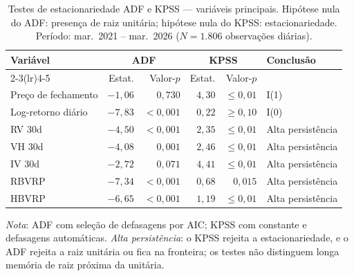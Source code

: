 \begin{table}[H]
\centering
\small
\caption[Testes de estacionariedade ADF e KPSS]{Testes de estacionariedade ADF e KPSS --- variáveis principais. Hipótese nula do ADF: presença de raiz unitária; hipótese nula do KPSS: estacionariedade. Período: mar.\ 2021 -- mar.\ 2026 ($N = 1{.}806$ observações diárias).}
\label{tab:dados-adf-kpss}
\begin{tabular}{lrrrrl}
\toprule
Variável & \multicolumn{2}{c}{ADF} & \multicolumn{2}{c}{KPSS} & Conclusão \\
\cmidrule(lr){2-3}\cmidrule(lr){4-5}
 & Estat. & Valor-$p$ & Estat. & Valor-$p$ & \\
\midrule
Preço de fechamento & $-1{,}06$ & $0{,}730$ & $4{,}30$ & ${\leq}0{,}01$ & I(1) \\
Log-retorno diário & $-7{,}83$ & $< 0{,}001$ & $0{,}22$ & ${\geq}0{,}10$ & I(0) \\
RV 30d & $-4{,}50$ & $< 0{,}001$ & $2{,}35$ & ${\leq}0{,}01$ & Alta persistência \\
VH 30d & $-4{,}08$ & $0{,}001$ & $2{,}46$ & ${\leq}0{,}01$ & Alta persistência \\
IV 30d & $-2{,}72$ & $0{,}071$ & $4{,}41$ & ${\leq}0{,}01$ & Alta persistência \\
RBVRP & $-7{,}34$ & $< 0{,}001$ & $0{,}68$ & $0{,}015$ & Alta persistência \\
HBVRP & $-6{,}65$ & $< 0{,}001$ & $1{,}19$ & ${\leq}0{,}01$ & Alta persistência \\
\bottomrule
\end{tabular}
\par\smallskip
\parbox{0.95\linewidth}{\footnotesize\textit{Nota}: ADF com seleção de defasagens por AIC; KPSS com constante e defasagens automáticas. \textit{Alta persistência}: o KPSS rejeita a estacionariedade, e o ADF rejeita a raiz unitária ou fica na fronteira; os testes não distinguem longa memória de raiz próxima da unitária.}
\end{table}
